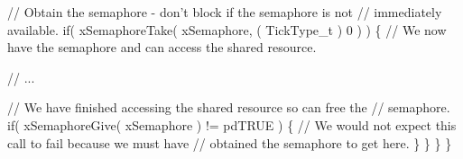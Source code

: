 \begin{DoxyPre}       // Obtain the semaphore - don't block if the semaphore is not
       // immediately available.
       if( xSemaphoreTake( xSemaphore, ( TickType\_t ) 0 ) )
       \{
           // We now have the semaphore and can access the shared resource.\end{DoxyPre}



\begin{DoxyPre}           // ...\end{DoxyPre}



\begin{DoxyPre}           // We have finished accessing the shared resource so can free the
           // semaphore.
           if( xSemaphoreGive( xSemaphore ) != pdTRUE )
           \{
               // We would not expect this call to fail because we must have
               // obtained the semaphore to get here.
           \}
       \}
   \}
\}
\end{DoxyPre}
 